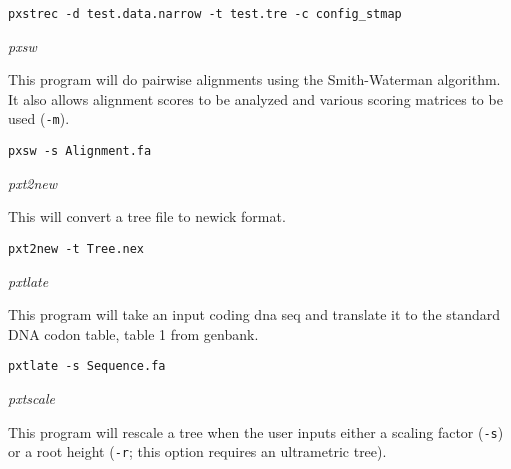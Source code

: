 \documentclass[12pt,letterpaper]{article}
\renewcommand{\subsection}[1]{%
\bigskip
\begin{center}
\begin{large}
\normalfont\itshape #1
\end{large}
\end{center}}
\begin{document}
\begin{flushleft}
\begin{verbatim}
pxstrec -d test.data.narrow -t test.tre -c config_stmap
\end{verbatim}
\end{flushleft}

\subsection{pxsw}

This program will do pairwise alignments using the Smith-Waterman algorithm. It also allows alignment scores to be analyzed and various scoring matrices to be used (\texttt{-m}).

\begin{flushleft}
\begin{verbatim}
pxsw -s Alignment.fa
\end{verbatim}
\end{flushleft}

\subsection{pxt2new}

This will convert a tree file to newick format.

\begin{flushleft}
\begin{verbatim}
pxt2new -t Tree.nex
\end{verbatim}
\end{flushleft}

\subsection{pxtlate}

This program will take an input coding dna seq and translate it to the standard DNA codon table, table 1 from genbank.


\begin{flushleft}
\begin{verbatim}
pxtlate -s Sequence.fa
\end{verbatim}
\end{flushleft}

\subsection{pxtscale}

This program will rescale a tree when the user inputs either a scaling factor (\texttt{-s}) or a root height (\texttt{-r}; this option requires an ultrametric tree).
\end{document}
